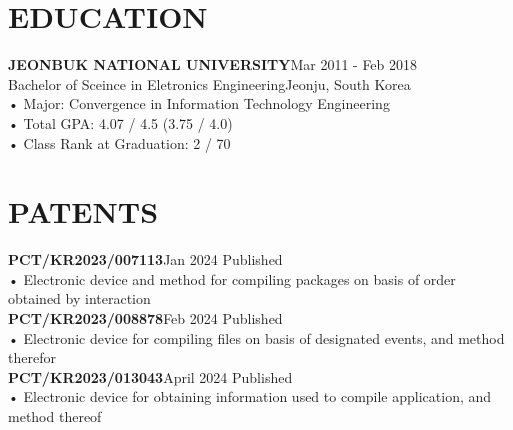 \documentclass[margin]{res}
\begin{document}
\begin{resume}

\section{EDUCATION}
\textbf{JEONBUK NATIONAL UNIVERSITY}\hfill Mar 2011 - Feb 2018\\
Bachelor of Sceince in Eletronics Engineering\hfill Jeonju, South Korea\\
• Major: Convergence in Information Technology Engineering\\
• Total GPA: 4.07 / 4.5 (3.75 / 4.0)\\
• Class Rank at Graduation: 2 / 70





\section{PATENTS}
\textbf{PCT/KR2023/007113}\hfill Jan 2024 Published\\
• Electronic device and method for compiling packages on basis of order obtained by interaction\\
\textbf{PCT/KR2023/008878}\hfill Feb 2024 Published\\
• Electronic device for compiling files on basis of designated events, and method therefor\\
\textbf{PCT/KR2023/013043}\hfill April 2024 Published\\
• Electronic device for obtaining information used to compile application, and method thereof



\end{resume}
\end{document}
